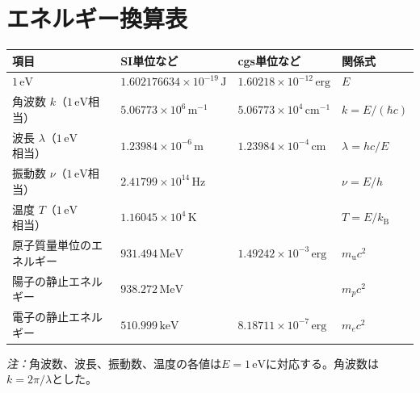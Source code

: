 \section{エネルギー換算表}\label{sec:app-unit-energy}
{\fontsize{9pt}{10.6pt}\selectfont
\begin{tabular}{@{}p{4.2cm}p{4.15cm}p{3.75cm}p{3.25cm}@{}}
\toprule
項目 & SI単位など & cgs単位など & 関係式 \\
\midrule
$1\,\mathrm{eV}$ & $1.602176634\times10^{-19}\,\mathrm J$ & $1.60218\times10^{-12}\,\mathrm{erg}$ & $E$ \\
角波数 $k$（$1\,\mathrm{eV}$相当） & $5.06773\times10^6\,\mathrm{m^{-1}}$ & $5.06773\times10^4\,\mathrm{cm^{-1}}$ & $k=E/(\hbar c)$ \\
波長 $\lambda$（$1\,\mathrm{eV}$相当） & $1.23984\times10^{-6}\,\mathrm m$ & $1.23984\times10^{-4}\,\mathrm{cm}$ & $\lambda=hc/E$ \\
振動数 $\nu$（$1\,\mathrm{eV}$相当） & $2.41799\times10^{14}\,\mathrm{Hz}$ & & $\nu=E/h$ \\
温度 $T$（$1\,\mathrm{eV}$相当） & $1.16045\times10^4\,\mathrm K$ & & $T=E/k_{\mathrm B}$ \\
原子質量単位のエネルギー & $931.494\,\mathrm{MeV}$ & $1.49242\times10^{-3}\,\mathrm{erg}$ & $m_{\mathrm u}c^2$ \\
陽子の静止エネルギー & $938.272\,\mathrm{MeV}$ & & $m_pc^2$ \\
電子の静止エネルギー & $510.999\,\mathrm{keV}$ & $8.18711\times10^{-7}\,\mathrm{erg}$ & $m_ec^2$ \\
\bottomrule
\end{tabular}
}
\par\noindent\footnotesize\textit{注：}角波数、波長、振動数、温度の各値は$E=1\,\mathrm{eV}$に対応する。角波数は$k=2\pi/\lambda$とした。\normalsize

